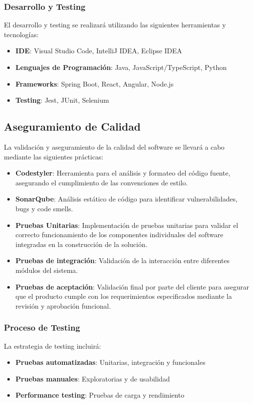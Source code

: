 \subsubsection{Desarrollo y Testing}
El desarrollo y testing se realizará utilizando las siguientes herramientas y tecnologías:
\begin{itemize}
    \item \textbf{IDE}: Visual Studio Code, IntelliJ IDEA, Eclipse IDEA
    \item \textbf{Lenguajes de Programación}: Java, JavaScript/TypeScript, Python
    \item \textbf{Frameworks}: Spring Boot, React, Angular, Node.js
    \item \textbf{Testing}: Jest, JUnit, Selenium
\end{itemize}
\subsection{Aseguramiento de Calidad}
La validación y aseguramiento de la calidad del software se llevará a cabo mediante las siguientes prácticas:
\begin{itemize}
    \item \textbf{Codestyler}: Herramienta para el análisis y formateo del código fuente, asegurando el cumplimiento de las convenciones de estilo.
    \item \textbf{SonarQube}: Análisis estático de código para identificar vulnerabilidades, bugs y code smells.
    \item \textbf{Pruebas Unitarias}: Implementación de pruebas unitarias para validar el correcto funcionamiento de los componentes individuales del software integradas en la construcción de la solución.
    \item \textbf{Pruebas de integración}: Validación de la interacción entre diferentes módulos del sistema.
    \item \textbf{Pruebas de aceptación}: Validación final por parte del cliente para asegurar que el producto cumple con los requerimientos especificados mediante la revisión y aprobación funcional.
\end{itemize}
\subsubsection{Proceso de Testing}
La estrategia de testing incluirá:
\begin{itemize}
    \item \textbf{Pruebas automatizadas}: Unitarias, integración y funcionales
    \item \textbf{Pruebas manuales}: Exploratorias y de usabilidad
    \item \textbf{Performance testing}: Pruebas de carga y rendimiento
\end{itemize}

